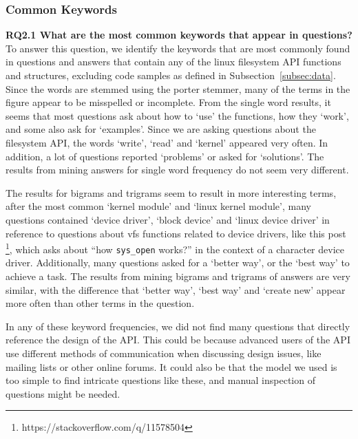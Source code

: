 \subsubsection{Common Keywords}
\textbf{RQ2.1 What are the most common keywords that appear in questions?}
To answer this question, we identify the keywords that are most commonly found in questions and answers that contain any of the linux filesystem API functions and structures, excluding code samples as defined in Subsection~\ref{subsec:data}. Since the words are stemmed using the porter stemmer, many of the terms in the figure appear to be misspelled or incomplete.
From the single word results, it seems that most questions ask about how to `use' the functions, how they `work', and some also ask for `examples'. Since we are asking questions about the filesystem API, the words `write', `read' and `kernel' appeared very often. In addition, a lot of questions reported `problems' or asked for `solutions'. The results from mining answers for single word frequency do not seem very different.

The results for bigrams and trigrams seem to result in more interesting terms, after the most common `kernel module' and `linux kernel module', many questions contained `device driver', `block device' and `linux device driver' in reference to questions about vfs functions related to device drivers, like this post \footnote{https://stackoverflow.com/q/11578504}, which asks about ``how \texttt{sys\_open} works?'' in the context of a character device driver. Additionally, many questions asked for a `better way', or the `best way' to achieve a task. The results from mining bigrams and trigrams of answers are very similar, with the difference that `better way', `best way' and `create new' appear more often than other terms in the question.

In any of these keyword frequencies, we did not find many questions that directly reference the design of the API. This could be because advanced users of the API use different methods of communication when discussing design issues, like mailing lists or other online forums. It could also be that the model we used is too simple to find intricate questions like these, and manual inspection of questions might be needed.


